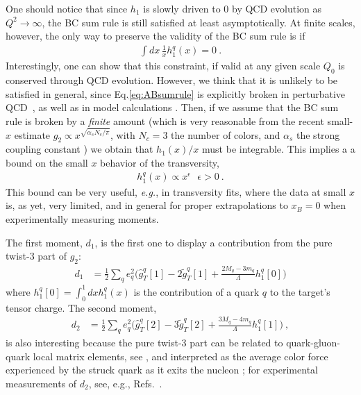 \documentclass[preprintnumbers,floatfix,nofootinbib]{revtex4}
\newcommand{\eg}{{\em e.g.}}
\newcommand{\mj}{M_q}
\newcommand{\mq}{m_q}
\begin{document}
One should notice that since $h_1$ is slowly driven to 0 by QCD evolution as $Q^2 \to \infty$, the BC sum rule is still satisfied at least
asymptotically.
At finite scales, however, the only way to preserve the validity of the
BC sum rule is if
\begin{align}
   \int dx\, \frac{1}{x} h_1^q(x) = 0 \ .
\label{eq:ABsumrule}
\end{align}
Interestingly, one can show that this constraint, if valid at any given scale
$Q_0$ is conserved through QCD evolution. However, we think that it is unlikely to be satisfied in general, since Eq.\eqref{eq:ABsumrule} is explicitly broken in perturbative QCD~\cite{Kundu:2001pk}, as well as in model calculations \cite{Schweitzer:2001sr,Wakamatsu:2007nc,Pasquini:2005dk,Cloet:2007em,Bacchetta:2008af,Bourrely:2010ng}. Then, if we assume that the BC sum rule is broken by a {\em finite} amount (which is very reasonable from the recent small-$x$ estimate $g_2\propto x^{\sqrt{ \alpha_s N_c / \pi}}$, with $N_c=3$ the number of colors, and $\alpha_s$ the strong coupling constant \cite{Kovchegov:2016zex})
we obtain that $h_1(x)/x$ must be integrable. This implies a 
a bound on the small $x$ behavior of the transversity, 
\begin{align}
  h_1^q(x) \propto x^\epsilon \ \ \ \epsilon>0 \ .
\label{eq:ABbound}
\end{align}
This bound can be very useful, \eg, in transversity fits, where the data at
small $x$ is, as yet, very limited, and in general for proper extrapolations
to $x_B=0$ when experimentally measuring moments. 

The first moment, $d_1$, is the first one to display a contribution from the pure twist-3 part of $g_2$:
\begin{align}
  d_1 & = \frac12 \sum_q e_q^2 \bigg(  \hat g_T^q[1] - 2 \tilde g_T^q[1]
    + \frac{2\mj-3\mq}{\Lambda} h_1^q[0] \bigg)
\label{e:d1}
\end{align}
where $h_1^q[0] = \int_0^1 dx h_1^q(x)$ is the contribution of a quark $q$ to the target's tensor charge. The second moment,
\begin{align}
  d_2 & = \frac12 \sum_q e_q^2 \bigg(\hat g_T^q[2] - 3 \tilde g_T^q[2] 
    + \frac{3\mj-4\mq}{\Lambda} h_1^q[1] \bigg) \ ,
\end{align}
is also interesting because the pure twist-3 part can be related to quark-gluon-quark local matrix elements, see \cite{Jaffe:1996zw}, and
interpreted as the average color force experienced by the struck quark as
it exits the nucleon \cite{Burkardt:2012sd}; for experimental
measurements of $d_2$, see, e.g., Refs.~\cite{Anthony:2002hy,Slifer:2008xu,Solvignon:2013yun,Posik:2014usi,Flay:2016wie}. 
\end{document}
